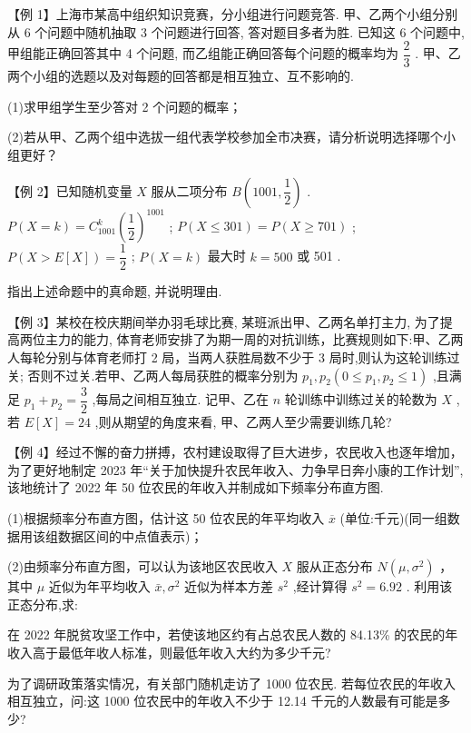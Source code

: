 【例 1】上海市某高中组织知识竞赛，分小组进行问题竞答. 甲、乙两个小组分别从 6 个问题中随机抽取 3 个问题进行回答, 答对题目多者为胜. 已知这 6 个问题中, 甲组能正确回答其中 4 个问题, 而乙组能正确回答每个问题的概率均为 $\dfrac{2}{3}$ . 甲、乙两个小组的选题以及对每题的回答都是相互独立、互不影响的.

(1)求甲组学生至少答对 2 个问题的概率；

(2)若从甲、乙两个组中选拔一组代表学校参加全市决赛，请分析说明选择哪个小组更好？

【例 2】已知随机变量 $X$ 服从二项分布 $B\left( {{1001},\dfrac{1}{2}}\right)$ .    $P\left( {X = k}\right)  = {{C}}_{1001}^{k}{\left( \dfrac{1}{2}\right) }^{1001}$ ;    $P\left( {X \leq  {301}}\right)  =  P\left( {X \geq  {701}}\right)$ ;    $P\left( {X > E\left\lbrack  X\right\rbrack  }\right)  = \dfrac{1}{2}$ ;    $P\left( {X = k}\right)$ 最大时 $k = {500}$ 或 501 .

指出上述命题中的真命题, 并说明理由.


【例 3】某校在校庆期间举办羽毛球比赛, 某班派出甲、乙两名单打主力, 为了提高两位主力的能力, 体育老师安排了为期一周的对抗训练，比赛规则如下:甲、乙两人每轮分别与体育老师打 2 局，当两人获胜局数不少于 3 局时,则认为这轮训练过关; 否则不过关.若甲、乙两人每局获胜的概率分别为 ${p}_{1},{p}_{2}\left( {0 \leq  {p}_{1},{p}_{2} \leq  1}\right)$ ,且满足 ${p}_{1} + {p}_{2} = \dfrac{3}{2}$ ,每局之间相互独立. 记甲、乙在 $n$ 轮训练中训练过关的轮数为 $X$ ,若 $E\left\lbrack  X\right\rbrack   = {24}$ ,则从期望的角度来看, 甲、乙两人至少需要训练几轮?

【例 4】经过不懈的奋力拼搏，农村建设取得了巨大进步，农民收入也逐年增加，为了更好地制定 2023 年“关于加快提升农民年收入、力争早日奔小康的工作计划”, 该地统计了 2022 年 50 位农民的年收入并制成如下频率分布直方图.

(1)根据频率分布直方图，估计这 50 位农民的年平均收入 $\overline{x}$ (单位:千元)(同一组数据用该组数据区间的中点值表示)；

(2)由频率分布直方图，可以认为该地区农民收入 $X$ 服从正态分布 $N\left( {\mu ,{\sigma }^{2}}\right)$ ，其中 $\mu$ 近似为年平均收入 $\bar{x},{\sigma }^{2}$ 近似为样本方差 ${s}^{2}$ ,经计算得 ${s}^{2} = {6.92}$ . 利用该正态分布,求:

   在 2022 年脱贫攻坚工作中，若使该地区约有占总农民人数的 84.13\% 的农民的年收入高于最低年收人标准，则最低年收入大约为多少千元?

  为了调研政策落实情况，有关部门随机走访了 1000 位农民. 若每位农民的年收入相互独立，问:这 1000 位农民中的年收入不少于 12.14 千元的人数最有可能是多少?


